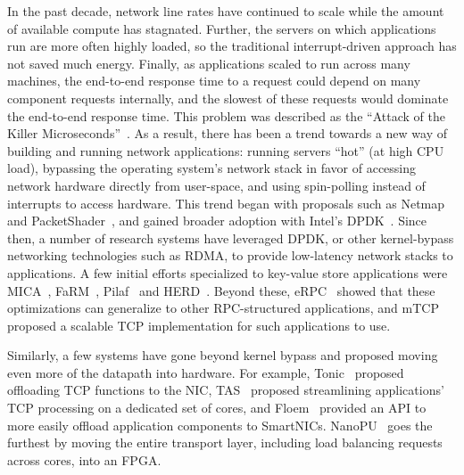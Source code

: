 In the past decade, network line rates have continued to scale while the amount of available compute has stagnated. Further, the servers on which applications run are more often highly loaded, so the traditional interrupt-driven approach has not saved much energy. Finally, as applications scaled to run across many machines, the end-to-end response time to a request could depend on many component requests internally, and the slowest of these requests would dominate the end-to-end response time.
This problem was described as the ``Attack of the Killer Microseconds''~\cite{killer-microseconds}.
As a result, there has been a trend towards a new way of building and running network applications: running servers ``hot'' (\ie at high CPU load), bypassing the operating system's network stack in favor of accessing network hardware directly from user-space, and using spin-polling instead of interrupts to access hardware.
This trend began with proposals such as Netmap~\cite{netmap} and PacketShader~\cite{packetshader}, and gained broader adoption with Intel's DPDK~\cite{dpdk}.
Since then, a number of research systems have leveraged DPDK, or other kernel-bypass networking technologies such as RDMA, to provide low-latency network stacks to applications. A few initial efforts specialized to key-value store applications were MICA~\cite{mica}, FaRM~\cite{farm}, Pilaf~\cite{pilaf} and HERD~\cite{herd}.
Beyond these, eRPC~\cite{erpc} showed that these optimizations can generalize to other RPC-structured applications, and mTCP~\cite{mtcp} proposed a scalable TCP implementation for such applications to use.

Similarly, a few systems have gone beyond kernel bypass and proposed moving even more of the datapath into hardware. For example, Tonic~\cite{tonic} proposed offloading TCP functions to the NIC,
TAS~\cite{tas} proposed streamlining applications' TCP processing on a dedicated set of cores,
and Floem~\cite{floem} provided an API to more easily offload application components to SmartNICs. NanoPU~\cite{nanopu} goes the furthest by moving the entire transport layer, including load balancing requests across cores, into an FPGA.

